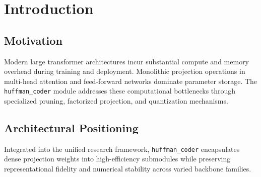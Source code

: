 \section{Introduction}

\subsection{Motivation}
Modern large transformer architectures incur substantial compute and memory overhead during training and deployment. Monolithic projection operations in multi-head attention and feed-forward networks dominate parameter storage. The \texttt{huffman_coder} module addresses these computational bottlenecks through specialized pruning, factorized projection, and quantization mechanisms.

\subsection{Architectural Positioning}
Integrated into the unified research framework, \texttt{huffman_coder} encapsulates dense projection weights into high-efficiency submodules while preserving representational fidelity and numerical stability across varied backbone families.

